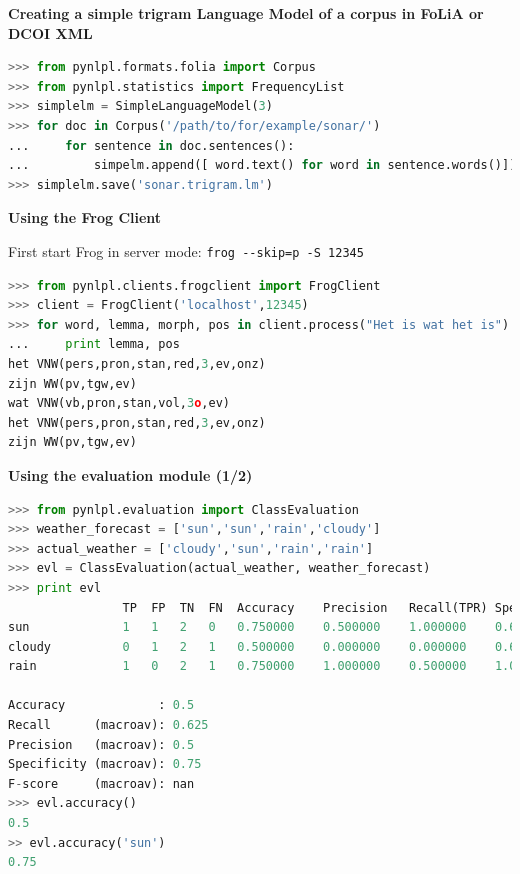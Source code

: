 \documentclass[compress]{beamer}
\begin{document}
\begin{frame}[fragile]

\textbf{Creating a simple trigram Language Model of a corpus in FoLiA or DCOI XML} 

\begin{lstlisting}[language=python]
>>> from pynlpl.formats.folia import Corpus
>>> from pynlpl.statistics import FrequencyList
>>> simplelm = SimpleLanguageModel(3)
>>> for doc in Corpus('/path/to/for/example/sonar/')
...     for sentence in doc.sentences():
...         simpelm.append([ word.text() for word in sentence.words()])
>>> simplelm.save('sonar.trigram.lm')   
\end{lstlisting}


\end{frame}


\begin{frame}[fragile]

\textbf{Using the Frog Client}

First start Frog in server mode: \verb|frog --skip=p -S 12345|

\begin{lstlisting}[language=python]
>>> from pynlpl.clients.frogclient import FrogClient
>>> client = FrogClient('localhost',12345)
>>> for word, lemma, morph, pos in client.process("Het is wat het is"):
...     print lemma, pos
het VNW(pers,pron,stan,red,3,ev,onz)
zijn WW(pv,tgw,ev)	
wat VNW(vb,pron,stan,vol,3o,ev)
het VNW(pers,pron,stan,red,3,ev,onz)
zijn WW(pv,tgw,ev)
\end{lstlisting}

\end{frame}

\begin{frame}[fragile]

\textbf{Using the evaluation module (1/2)} 

\footnotesize
\begin{lstlisting}[language=python]
>>> from pynlpl.evaluation import ClassEvaluation
>>> weather_forecast = ['sun','sun','rain','cloudy']
>>> actual_weather = ['cloudy','sun','rain','rain']
>>> evl = ClassEvaluation(actual_weather, weather_forecast)
>>> print evl
                TP	FP	TN	FN	Accuracy	Precision	Recall(TPR)	Specificity(TNR)	F-score
sun             1	1	2	0	0.750000	0.500000	1.000000	0.666667	0.666667
cloudy          0	1	2	1	0.500000	0.000000	0.000000	0.666667	 nan
rain            1	0	2	1	0.750000	1.000000	0.500000	1.000000	0.666667

Accuracy             : 0.5
Recall      (macroav): 0.625
Precision   (macroav): 0.5
Specificity (macroav): 0.75
F-score     (macroav): nan
>>> evl.accuracy()
0.5
>> evl.accuracy('sun')
0.75
\end{lstlisting}
\normalsize


\end{frame}
\end{document}
